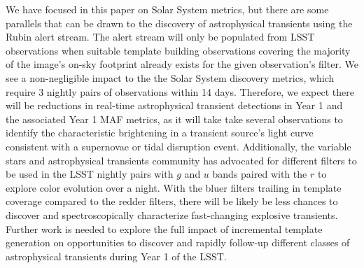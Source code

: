 \documentclass[preprint,linenumbers]{aastex631}
\begin{document}
{		We have focused in this paper on Solar System metrics, but there are some parallels that can be drawn to the discovery of astrophysical transients using the Rubin alert stream. The alert stream will only be populated from LSST observations when suitable template building observations covering the majority of the image's on-sky footprint already exists for the given observation's filter. We see a non-negligible impact to the the Solar System discovery metrics, which require 3 nightly pairs of observations within 14 days. Therefore, we expect there will be reductions in real-time astrophysical transient detections in Year 1 and the associated Year 1 MAF metrics, as it will take take several observations to identify the characteristic brightening in a transient source's light curve consistent with a supernovae or tidal disruption event. Additionally, the variable stars and astrophysical transients community has advocated for different filters to be used in the LSST nightly pairs \citep{2019PASPpresto} with $g$ and $u$ bands paired with the $r$ \citep{SCOC_Report_1, SCOC_Report_2} to explore color evolution over a night. With the bluer filters trailing in template coverage compared to the redder filters, there will be likely be less chances to discover and spectroscopically characterize fast-changing explosive transients.  Further work is needed to explore the full impact of incremental template generation on opportunities to discover and rapidly follow-up different classes of astrophysical transients during Year 1 of the LSST. 
		
}
\end{document}
